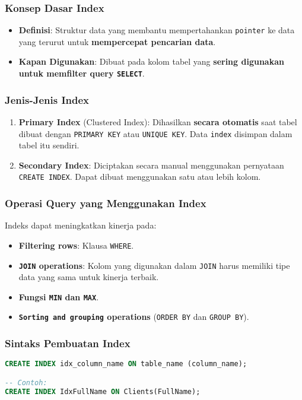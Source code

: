 \documentclass{article}
\begin{document}
\subsubsection{Konsep Dasar Index}
\begin{itemize}
    \item \textbf{Definisi}: Struktur data yang membantu mempertahankan \texttt{pointer} ke data yang terurut untuk \textbf{mempercepat pencarian data}.
    \item \textbf{Kapan Digunakan}: Dibuat pada kolom tabel yang \textbf{sering digunakan untuk memfilter query \texttt{SELECT}}.
\end{itemize}

\subsubsection{Jenis-Jenis Index}
\begin{enumerate}
    \item \textbf{Primary Index} (Clustered Index): Dihasilkan \textbf{secara otomatis} saat tabel dibuat dengan \texttt{PRIMARY KEY} atau \texttt{UNIQUE KEY}. Data \texttt{index} disimpan dalam tabel itu sendiri.
    \item \textbf{Secondary Index}: Diciptakan secara manual menggunakan pernyataan \texttt{CREATE INDEX}. Dapat dibuat menggunakan satu atau lebih kolom.
\end{enumerate}

\subsubsection{Operasi Query yang Menggunakan Index}
Indeks dapat meningkatkan kinerja pada:
\begin{itemize}
    \item \textbf{Filtering rows}: Klausa \texttt{WHERE}.
    \item \textbf{\texttt{JOIN} operations}: Kolom yang digunakan dalam \texttt{JOIN} harus memiliki tipe data yang sama untuk kinerja terbaik.
    \item \textbf{Fungsi \texttt{MIN} dan \texttt{MAX}}.
    \item \textbf{\texttt{Sorting and grouping} operations} (\texttt{ORDER BY} dan \texttt{GROUP BY}).
\end{itemize}

\subsubsection{Sintaks Pembuatan Index}
\begin{lstlisting}[language=SQL, caption={Membuat Secondary Index}, captionpos=b]
CREATE INDEX idx_column_name ON table_name (column_name);

-- Contoh:
CREATE INDEX IdxFullName ON Clients(FullName);
\end{lstlisting}
\end{document}
